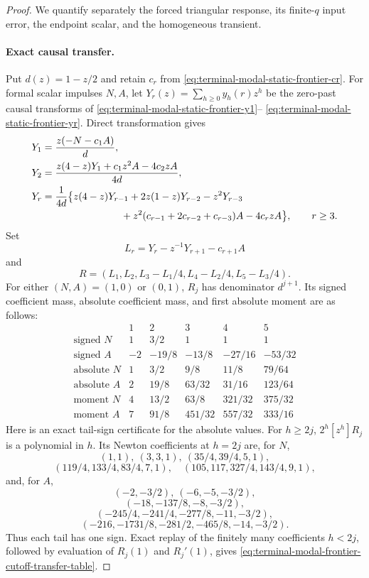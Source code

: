 \begin{proof}
We quantify separately the forced triangular response, its finite-$q$ input
error, the endpoint scalar, and the homogeneous transient.

\paragraph{Exact causal transfer.}
Put $d(z)=1-z/2$ and retain $c_r$ from
\eqref{eq:terminal-modal-static-frontier-cr}.  For formal scalar impulses
$N,A$, let $Y_r(z)=\sum_{h\ge0}y_h(r)z^h$ be the zero-past causal transforms
of \eqref{eq:terminal-modal-static-frontier-y1}--
\eqref{eq:terminal-modal-static-frontier-yr}.  Direct transformation gives
\begin{align}
 Y_1&=\frac{z(-N-c_1A)}{d},\notag\\
 Y_2&=\frac{z(4-z)Y_1+c_1z^2A-4c_2zA}{4d},\notag\\
 Y_r&=\frac{1}{4d}\bigl\{
 z(4-z)Y_{r-1}+2z(1-z)Y_{r-2}-z^2Y_{r-3}\notag\\
 &\hspace{28mm}
 +z^2(c_{r-1}+2c_{r-2}+c_{r-3})A-4c_rzA\bigr\},
 \qquad r\ge3.
 \label{eq:terminal-modal-frontier-cutoff-transfer}
\end{align}
Set
\[
 L_r=Y_r-z^{-1}Y_{r+1}-c_{r+1}A
\]
and
\[
 R=(L_1,L_2,L_3-L_1/4,L_4-L_2/4,L_5-L_3/4).
\]
For either $(N,A)=(1,0)$ or $(0,1)$, $R_j$ has denominator
$d^{j+1}$.  Its signed coefficient mass, absolute coefficient mass, and
first absolute moment are as follows:
\begin{equation}
\begin{array}{c|ccccc}
 &1&2&3&4&5\\ \hline
 \text{signed }N&1&3/2&1&1&1\\
 \text{signed }A&-2&-19/8&-13/8&-27/16&-53/32\\ \hline
 \text{absolute }N&1&3/2&9/8&11/8&79/64\\
 \text{absolute }A&2&19/8&63/32&31/16&123/64\\ \hline
 \text{moment }N&4&13/2&63/8&321/32&375/32\\
 \text{moment }A&7&91/8&451/32&557/32&333/16
\end{array}
\label{eq:terminal-modal-frontier-cutoff-transfer-table}
\end{equation}
Here is an exact tail-sign certificate for the absolute values.  For
$h\ge2j$, $2^h[z^h]R_j$ is a polynomial in $h$.  Its Newton coefficients at
$h=2j$ are, for $N$,
\[
 (1,1),\ (3,3,1),\ (35/4,39/4,5,1),
\]
\[
 (119/4,133/4,83/4,7,1),\quad
 (105,117,327/4,143/4,9,1),
\]
and, for $A$,
\[
 (-2,-3/2),\ (-6,-5,-3/2),
\]
\[
 (-18,-137/8,-8,-3/2),
\]
\[
 (-245/4,-241/4,-277/8,-11,-3/2),
\]
\[
 (-216,-1731/8,-281/2,-465/8,-14,-3/2).
\]
Thus each tail has one sign.  Exact replay of the finitely many coefficients
$h<2j$, followed by evaluation of $R_j(1)$ and $R_j'(1)$, gives
\eqref{eq:terminal-modal-frontier-cutoff-transfer-table}.


\end{proof}
